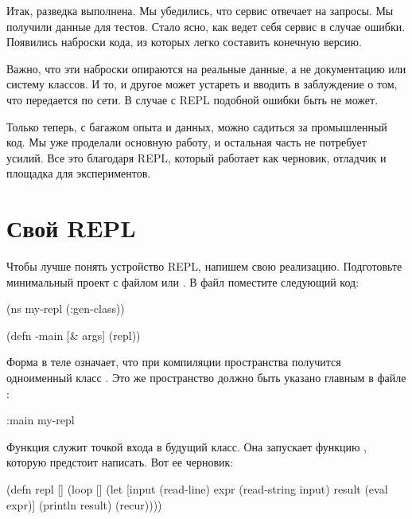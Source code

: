 Итак, разведка выполнена. Мы убедились, что сервис отвечает на запросы. Мы получили данные для тестов. Стало ясно, как ведет себя сервис в случае ошибки. Появились наброски кода, из которых легко составить конечную версию.

Важно, что эти наброски опираются на реальные данные, а не документацию или систему классов. И то, и другое может устареть и вводить в заблуждение о том, что передается по сети. В случае с REPL подобной ошибки быть не может.

Только теперь, с багажом опыта и данных, можно садиться за промышленный код. Мы уже проделали основную работу, и остальная часть не потребует усилий. Все это благодаря REPL, который работает как черновик, отладчик и площадка для экспериментов.

\section{Свой REPL}

Чтобы лучше понять устройство REPL, напишем свою реализацию. Подготовьте минимальный проект с файлом  или . В файл  поместите следующий код:

\begin{english}
  \begin{clojure/lines}
(ns my-repl
  (:gen-class))

(defn -main [& args]
  (repl))
  \end{clojure/lines}
\end{english}

Форма  в теле  означает, что при компиляции пространства получится одноименный класс . Это же пространство должно быть указано главным в файле :

\begin{english}
  \begin{clojure}
:main my-repl
  \end{clojure}
\end{english}

Функция  служит точкой входа в будущий класс. Она запускает функцию , которую предстоит написать. Вот ее черновик:

\begin{english}
  \begin{clojure}
(defn repl []
  (loop []
    (let [input (read-line)
          expr (read-string input)
          result (eval expr)]
      (println result)
      (recur))))
  \end{clojure}
\end{english}

